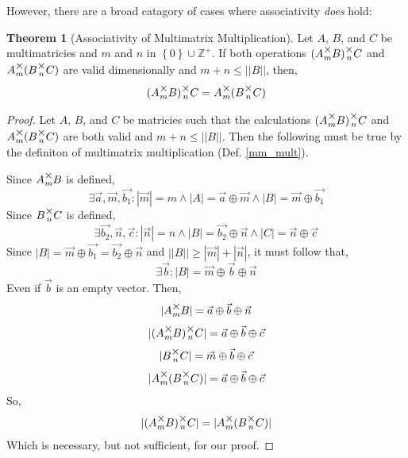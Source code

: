 \documentclass[12pt]{article}
\theoremstyle{definition}
\newtheorem{theorem}{Theorem}[section]
\theoremstyle{case}
\theoremstyle{ppart}
\newcommand{\mmult}[1]{\text{\raisebox{1ex}{$\underset{#1}{\times}$}}}
\begin{document}
However, there are a broad catagory of cases where associativity \textit{does} hold:

\begin{theorem}[Associativity of Multimatrix Multiplication]
\label{mm_associativity}
Let $A$, $B$, and $C$ be multimatricies and $m$ and $n$ in
$\left\{ 0 \right\} \cup \mathbb{Z}^{+}$.
If both operations $(A \mmult{m} B) \mmult{n} C$ and $A \mmult{m} (B \mmult{n} C)$
are valid dimensionally and $m+n \le ||B||$, then,
\[ (A \mmult{m} B) \mmult{n} C = A \mmult{m} (B \mmult{n} C) \]
\end{theorem}
\begin{proof}
Let $A$, $B$, and $C$ be matricies such that the calculations
$(A \mmult{m} B) \mmult{n} C$ and $A \mmult{m} (B \mmult{n} C)$ are both valid
and $m + n \le ||B||$.
Then the following must be true by the definiton of multimatrix multiplication
(Def. \ref{mm_mult}).

\noindent
Since $A \mmult{m} B$ is defined,
\[
 \exists \vec{a}, \vec{m}, \vec{b_1} :
 |\vec{m}| = m \land |A| = \vec{a} \oplus \vec{m} \land |B| = \vec{m} \oplus \vec{b_1} 
\]
Since $B \mmult{n} C$ is defined,
\[
 \exists \vec{b_2}, \vec{n}, \vec{c} :
 |\vec{n}| = n \land |B| = \vec{b_2} \oplus \vec{n} \land |C| = \vec{n} \oplus \vec{c}
\]
Since $|B| = \vec{m} \oplus \vec{b_1} = \vec{b_2} \oplus \vec{n}$ and
$||B|| \ge |\vec{m}| + |\vec{n}|$, it must follow that,
\[
 \exists \vec{b} :
 |B| = \vec{m} \oplus \vec{b} \oplus \vec{n}
\]
Even if $\vec{b}$ is an empty vector. Then,
\[ |A \mmult{m} B| = \vec{a} \oplus \vec{b} \oplus \vec{n} \]
\[ |(A \mmult{m} B) \mmult{n} C| = \vec{a} \oplus \vec{b} \oplus \vec{c} \]
\[ |B \mmult{n} C| = \vec{m} \oplus \vec{b} \oplus \vec{c} \]
\[ |A \mmult{m} (B \mmult{n} C)| = \vec{a} \oplus \vec{b} \oplus \vec{c} \]
So,
\[ |(A \mmult{m} B) \mmult{n} C| = |A \mmult{m} (B \mmult{n} C)| \]
Which is necessary, but not sufficient, for our proof.


\end{proof}
\end{document}
